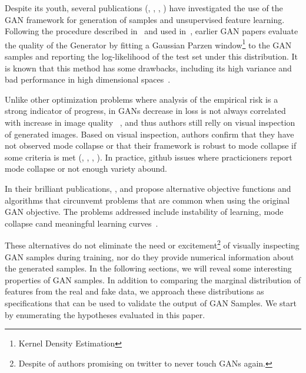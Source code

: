 Despite its youth, several publications (\cite{arjovsky2017towards}, 
\cite{salimans2016improved}, \cite{zhao2016energy}, 
\cite{radford2015unsupervised}) have investigated the use of the
GAN framework for generation of samples and unsupervised feature learning. 
Following the procedure described in~\cite{breuleux2011quickly} and
used in~\cite{goodfellow2014generative}, earlier GAN papers evaluate
the quality of the Generator by fitting a Gaussian Parzen window\footnote{Kernel
Density Estimation} to the GAN samples and reporting the log-likelihood of the
test set under this distribution. It is known that this method has some drawbacks, 
including its high variance and bad performance in high dimensional
spaces~\cite{goodfellow2014generative}.

Unlike other optimization problems where analysis of
the empirical risk is a strong indicator of progress, in GANs decrease in loss 
is not always correlated with increase in image quality 
~\cite{arjovsky2017wasserstein}, and thus authors still relly on visual 
inspection of generated images. Based on visual inspection, authors confirm that
they have not observed mode collapse or that their framework is robust to mode
collapse if some criteria is met (\cite{arjovsky2017wasserstein}, 
\cite{gulrajani2017improved}, \cite{mao2016least}, \cite{radford2015unsupervised}).
In practice, github issues where practicioners report mode collapse or not enough 
variety abound.

In their brilliant publications, \cite{mao2016least},
\cite{arjovsky2017wasserstein} and \cite{gulrajani2017improved} propose alternative
objective functions and algorithms that circunvemt problems that are common when using the
original GAN objective. The problems addressed include instability of learning,
mode collapse cand meaningful learning curves~\cite{salimans2016improved}.

These alternatives do not eliminate the need or excitement\footnote{Despite of
authors promising on twitter to never touch GANs again.} 
of visually inspecting GAN samples during training, nor do they provide
numerical information about the generated samples. In the following sections, we
will reveal some interesting properties of GAN samples. 
In addition to comparing the marginal distribution
of features from the real and fake data, we approach these distributions as
specifications that can be used to validate the output of GAN Samples. 
We start by enumerating the hypotheses evaluated in this paper.


